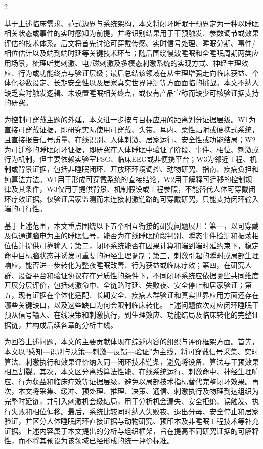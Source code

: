 \documentclass[UTF8,zihao=5,fontset=none]{ctexart}
\newcommand{\hei}{\CJKfamily{hei}}
\newcommand{\leveltwo}[1]{%
  \par\noindent{\hei\fontsize{10.5pt}{12.6pt}\selectfont\mdseries #1\par}}
\begin{document}
\begin{multicols}{2}
\leveltwo{1.4 本文综述范围与结构安排}

基于上述临床需求、范式边界与系统架构，本文将闭环睡眠干预界定为一种以睡眠相关状态或事件的实时感知为前提，并将识别结果用于干预触发、参数调节或效果评估的技术体系。后文将首先讨论可穿戴传感、实时信号处理、睡眠分期、事件/相位估计以及端到端时延等关键技术环节；随后围绕慢波睡眠和全睡眠周期两类应用场景，梳理听觉刺激、电/磁刺激及多模态刺激系统的实现方式、神经生理效应、行为或功能终点与验证层级；最后总结该领域在从生理增强走向临床获益、个体化参数设定、长期安全性以及居家真实世界评测等方面面临的挑战。本文不纳入缺乏实时触发逻辑、未设置睡眠相关终点，或仅有产品宣称而缺少可核验证据支持的研究。

为控制可穿戴主题的外延，本文进一步按与目标应用的距离划分证据层级。W1为直接可穿戴证据，即研究实际使用可穿戴、头带、耳内、柔性贴附或便携式系统，且直接报告信号质量、在线识别、人体刺激、居家运行、安全性或功能结局；W2为可迁移的睡眠闭环证据，即研究在人体睡眠中验证了阶段、事件、相位、刺激或行为机制，但主要依赖实验室PSG、临床EEG或非便携平台；W3为邻近工程、机制或背景证据，包括非睡眠闭环、开放环环境调控、动物研究、指南、疾病负担和纯算法方法。W1用于形成可穿戴系统的直接结论，W2用于解释可迁移的控制规律及其条件，W3仅用于提供背景、机制假设或工程参照，不能替代人体可穿戴闭环疗效证据。仅验证居家监测而未连接刺激链路的可穿戴研究，只能支持闭环输入端的可行性。

基于上述范围，本文重点围绕以下五个相互衔接的研究问题展开：第一，以可穿戴及低通道脑电为主的睡眠信号，能否为在线睡眠阶段判别、瞬态事件检测和振荡相位估计提供可靠输入；第二，闭环系统能否在因果计算和端到端时延约束下，稳定命中目标脑状态并诱发可重复的神经生理调制；第三，刺激引起的瞬时或局部生理响应，能否进一步转化为整夜睡眠改善、行为获益或临床疗效；第四，在研究人群、设备平台和验证协议存在异质性的条件下，不同闭环系统应依据哪些共同维度开展分层评价，包括刺激命中、全链路时延、失败夜、安全停止和居家验证；第五，现有证据在个体化适配、长期安全、疾病人群验证和真实世界应用方面还存在哪些关键缺口，以及这些缺口为何会限制临床转化。上述问题依次对应闭环睡眠干预从信号输入、在线决策和刺激执行，到生理效应、功能结局及临床转化的完整证据链，并构成后续各章的分析主线。\par

为回答上述问题，本文的主要贡献体现在综述内容的组织与评价框架方面。首先，本文以“感知—识别与决策—刺激—反馈—验证”为主线，将可穿戴信号采集、实时算法、刺激执行和效果评价纳入同一闭环技术链条，避免将设备、算法与干预效果相互割裂。其次，本文区分离线算法性能、在线系统运行、刺激命中、神经生理响应、行为获益和临床疗效等证据层级，避免以局部技术指标替代完整闭环效果。再次，本文将采集、缓冲、预处理、推理、决策、通信、刺激执行及物理到达组织为完整时延链，并引入刺激机会级结局，用于分析机会漏失、安全拒绝、误触发、执行失败和相位偏移。最后，系统比较同时纳入失败夜、退出分母、安全停止和居家验证，并区分人体睡眠闭环直接证据与动物研究、预印本及非睡眠工程技术等补充证据。上述内容属于本文提出的分析与组织框架，旨在提高不同研究证据的可解释性，而不将其预设为该领域已经形成的统一评价标准。\par

\end{multicols}
\end{document}
